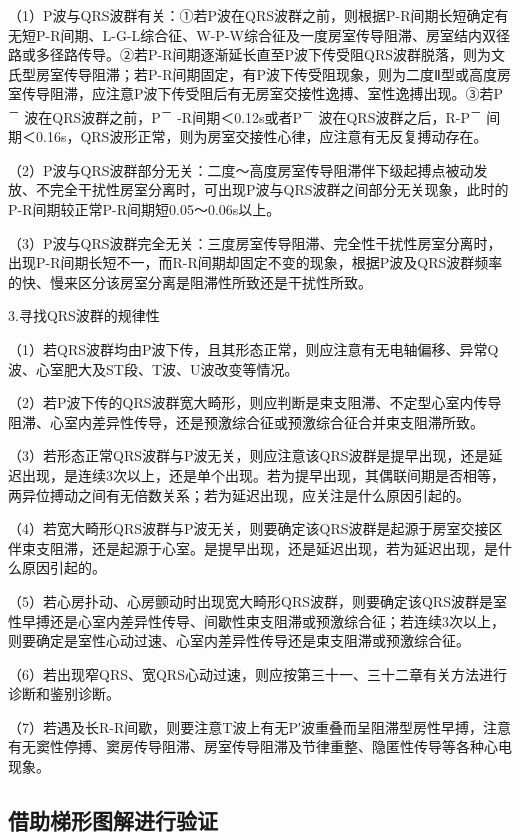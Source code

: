 （1）P波与QRS波群有关：①若P波在QRS波群之前，则根据P-R间期长短确定有无短P-R间期、L-G-L综合征、W-P-W综合征及一度房室传导阻滞、房室结内双径路或多径路传导。②若P-R间期逐渐延长直至P波下传受阻QRS波群脱落，则为文氏型房室传导阻滞；若P-R间期固定，有P波下传受阻现象，则为二度Ⅱ型或高度房室传导阻滞，应注意P波下传受阻后有无房室交接性逸搏、室性逸搏出现。③若P\textsuperscript{－}
波在QRS波群之前，P\textsuperscript{－}
-R间期＜0.12s或者P\textsuperscript{－}
波在QRS波群之后，R-P\textsuperscript{－}
间期＜0.16s，QRS波形正常，则为房室交接性心律，应注意有无反复搏动存在。

（2）P波与QRS波群部分无关：二度～高度房室传导阻滞伴下级起搏点被动发放、不完全干扰性房室分离时，可出现P波与QRS波群之间部分无关现象，此时的P-R间期较正常P-R间期短0.05～0.06s以上。

（3）P波与QRS波群完全无关：三度房室传导阻滞、完全性干扰性房室分离时，出现P-R间期长短不一，而R-R间期却固定不变的现象，根据P波及QRS波群频率的快、慢来区分该房室分离是阻滞性所致还是干扰性所致。

3.寻找QRS波群的规律性

（1）若QRS波群均由P波下传，且其形态正常，则应注意有无电轴偏移、异常Q波、心室肥大及ST段、T波、U波改变等情况。

（2）若P波下传的QRS波群宽大畸形，则应判断是束支阻滞、不定型心室内传导阻滞、心室内差异性传导，还是预激综合征或预激综合征合并束支阻滞所致。

（3）若形态正常QRS波群与P波无关，则应注意该QRS波群是提早出现，还是延迟出现，是连续3次以上，还是单个出现。若为提早出现，其偶联间期是否相等，两异位搏动之间有无倍数关系；若为延迟出现，应关注是什么原因引起的。

（4）若宽大畸形QRS波群与P波无关，则要确定该QRS波群是起源于房室交接区伴束支阻滞，还是起源于心室。是提早出现，还是延迟出现，若为延迟出现，是什么原因引起的。

（5）若心房扑动、心房颤动时出现宽大畸形QRS波群，则要确定该QRS波群是室性早搏还是心室内差异性传导、间歇性束支阻滞或预激综合征；若连续3次以上，则要确定是室性心动过速、心室内差异性传导还是束支阻滞或预激综合征。

（6）若出现窄QRS、宽QRS心动过速，则应按第三十一、三十二章有关方法进行诊断和鉴别诊断。

（7）若遇及长R-R间歇，则要注意T波上有无P′波重叠而呈阻滞型房性早搏，注意有无窦性停搏、窦房传导阻滞、房室传导阻滞及节律重整、隐匿性传导等各种心电现象。

\protect\hypertarget{text00016.htmlux5cux23subid118}{}{}

\subsection{借助梯形图解进行验证}

